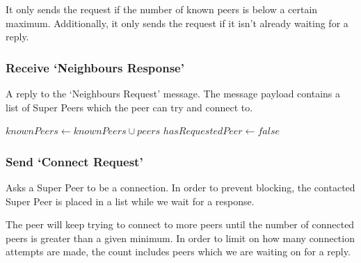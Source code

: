 It only sends the request if the number of known peers is below a certain
maximum. Additionally, it only sends the request if it isn't already waiting for
a reply.

\begin{algorithm}[H]

\end{algorithm}

\subsubsection{Receive `Neighbours Response'}

A reply to the `Neighbours Request' message. The message payload contains a
list of Super Peers which the peer can try and connect to.

\begin{algorithm}[H]

  $knownPeers \leftarrow knownPeers \cup  peers$\;
  $hasRequestedPeer \leftarrow false$\;
\end{algorithm}

\subsubsection{Send `Connect Request'}

Asks a Super Peer to be a connection. In order to prevent blocking, the
contacted Super Peer is placed in a list while we wait for a response. 

The peer will keep trying to connect to more peers until the number of connected
peers is greater than a given minimum. In order to limit on how many connection
attempts are made, the count includes peers which we are waiting on for a reply.

\begin{algorithm}[H]

\end{algorithm}

